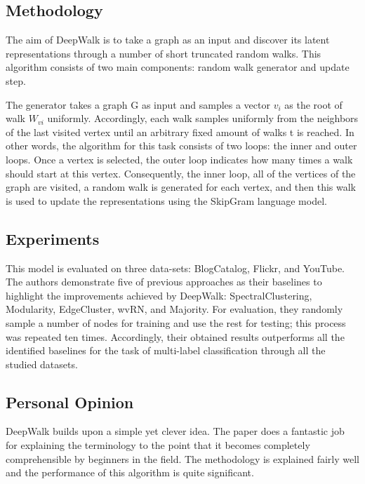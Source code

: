 \documentclass[12pt,a4paper]{article}
\begin{document}
	\vspace{-0.3cm}
	\subsection{Methodology}
	\noindent The aim of DeepWalk is to take a graph as an input and discover its latent representations through a number of short truncated random walks. This algorithm consists of two main components: random walk generator and update step. 

	\noindent The generator takes a graph G as input and samples a vector $v_i$ as the root of walk $W_{vi}$ uniformly. Accordingly, each walk samples uniformly from the neighbors of the last visited vertex until an arbitrary fixed amount of walks t is reached. In other words, the algorithm for this task consists of two loops: the inner and outer loops. Once a vertex is selected, the outer loop indicates how many times a walk should start at this vertex. Consequently, the inner loop, all of the vertices of the graph are visited, a random walk is generated for each vertex, and then this walk is used to update the representations using the SkipGram language model.
	
	\vspace{-0.3cm}
	\subsection{Experiments}
	\noindent This model is evaluated on three data-sets: BlogCatalog, Flickr, and YouTube. The authors demonstrate five of previous approaches as their baselines to highlight the improvements achieved by DeepWalk: SpectralClustering, Modularity, EdgeCluster, wvRN, and Majority. For evaluation, they randomly sample a number of nodes for training and use the rest for testing; this process was repeated ten times. Accordingly, their obtained results outperforms all the identified baselines for the task of multi-label classification through all the studied datasets.
	
	\vspace{-0.3cm}
	\subsection{Personal Opinion}
	\noindent DeepWalk builds upon a simple yet clever idea. The paper does a fantastic job for explaining the terminology to the point that it becomes completely comprehensible by beginners in the field. The methodology is explained fairly well and the performance of this algorithm is quite significant.
	
\end{document}
